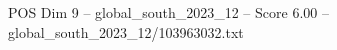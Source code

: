 \begin{textsample}{POS Dim 9 – global\_south\_2023\_12 – Score 6.00 – global\_south\_2023\_12/103963032.txt}
\end{textsample}
